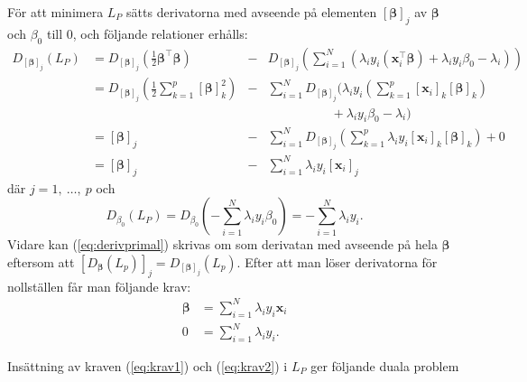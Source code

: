 \documentclass[a4paper, 12pt]{report}
\theoremstyle{definition}
\theoremstyle{remark}
\newcommand{\bfbeta}{{\boldsymbol{\beta}}}
\newcommand{\bfx}{\mathbf{x}}
\begin{document}
För att minimera $L_P$ sätts derivatorna med avseende på elementen $\left[\bfbeta\right]_j$ av $\bfbeta$ och $\beta_0$ till 0, och följande relationer erhålls:
\begin{equation}\label{eq:derivprimal}
\begin{aligned}
	D_{ \left[\bfbeta\right]_j } \left(L_P\right) &= D_{ \left[\bfbeta\right]_j } \left( \frac{1}{2} \bfbeta^\intercal \bfbeta \right) &- &D_{ \left[\bfbeta\right]_j } \left( \sum_{i=1}^{N} \left( \lambda_i y_i \left( \bfx_i^\intercal\bfbeta \right) + \lambda_i y_i \beta_0 - \lambda_i \right)\right)\\
	&= D_{ \left[\bfbeta\right]_j } \left( \frac{1}{2} \sum_{k=1}^{p} \left[\bfbeta\right]_k^2 \right)
	&- &\sum_{i=1}^{N} D_{ \left[\bfbeta\right]_j }
	\Big(  \lambda_i y_i \left( \sum_{k=1}^{p} \left[\mathbf{x}_i\right]_k \left[ \bfbeta \right]_k \right)\\
	& & &\qquad\qquad\quad+ \lambda_i y_i \beta_0-\lambda_i \Big)\\
	&= [\bfbeta]_j &- &\sum_{i=1}^{N} D_{ \left[\bfbeta\right]_j } \left( \sum_{k=1}^{p} \lambda_i y_i \left[\mathbf{x}_i\right]_k\left[\bfbeta\right]_k \right) + 0\\
	&= [\bfbeta]_j &- &\sum_{i=1}^{N}\lambda_i y_i \left[ \mathbf{x}_i \right]_j
\end{aligned}
\end{equation}
där $j=1,~\dots,~p$ och
\begin{equation*}
	D_{\beta_0}\left(L_P\right) = D_{\beta_0}\left( -\sum_{i=1}^{N} \lambda_i y_i \beta_0 \right) = -\sum_{i=1}^{N} \lambda_i y_i.
\end{equation*}
Vidare kan (\ref{eq:derivprimal}) skrivas om som derivatan med avseende på hela $\bfbeta$ eftersom att $ \left[ D_{ \bfbeta }\left(L_p\right) \right]_j = D_{\left[ \bfbeta \right]_j}\left(L_p\right) $. Efter att man löser derivatorna för nollställen får man följande krav:
\begin{align}\label{eq:krav1}
	\bfbeta &= \sum_{i=1}^{N} \lambda_i y_i \mathbf{x}_i\\
	0 &= \sum_{i=1}^{N} \lambda_i y_i.\label{eq:krav2}
\end{align}

Insättning av kraven (\ref{eq:krav1}) och (\ref{eq:krav2}) i $L_P$ ger följande duala problem
\end{document}
